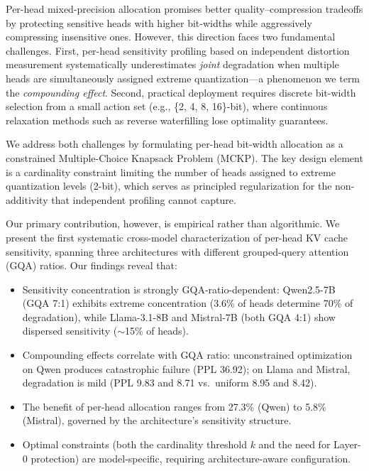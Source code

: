 \documentclass[11pt]{article}
\begin{document}
Per-head mixed-precision allocation promises better quality--compression tradeoffs by protecting sensitive heads with higher bit-widths while aggressively compressing insensitive ones.
However, this direction faces two fundamental challenges.
First, per-head sensitivity profiling based on independent distortion measurement systematically underestimates \emph{joint} degradation when multiple heads are simultaneously assigned extreme quantization---a phenomenon we term the \emph{compounding effect}.
Second, practical deployment requires discrete bit-width selection from a small action set (e.g., \{2, 4, 8, 16\}-bit), where continuous relaxation methods such as reverse waterfilling lose optimality guarantees.

We address both challenges by formulating per-head bit-width allocation as a constrained Multiple-Choice Knapsack Problem (MCKP).
The key design element is a cardinality constraint limiting the number of heads assigned to extreme quantization levels (2-bit), which serves as principled regularization for the non-additivity that independent profiling cannot capture.

Our primary contribution, however, is empirical rather than algorithmic.
We present the first systematic cross-model characterization of per-head KV cache sensitivity, spanning three architectures with different grouped-query attention (GQA) ratios.
Our findings reveal that:

\begin{itemize}[nosep,leftmargin=*]
  \item Sensitivity concentration is strongly GQA-ratio-dependent: Qwen2.5-7B (GQA 7:1) exhibits extreme concentration (3.6\% of heads determine 70\% of degradation), while Llama-3.1-8B and Mistral-7B (both GQA 4:1) show dispersed sensitivity ($\sim$15\% of heads).
  \item Compounding effects correlate with GQA ratio: unconstrained optimization on Qwen produces catastrophic failure (PPL 36.92); on Llama and Mistral, degradation is mild (PPL 9.83 and 8.71 vs.\ uniform 8.95 and 8.42).
  \item The benefit of per-head allocation ranges from 27.3\% (Qwen) to 5.8\% (Mistral), governed by the architecture's sensitivity structure.
  \item Optimal constraints (both the cardinality threshold $k$ and the need for Layer-0 protection) are model-specific, requiring architecture-aware configuration.
\end{itemize}
\end{document}
